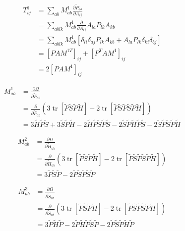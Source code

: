 \documentclass{article}
\newcommand{\tr}{\operatorname{tr}}
\begin{document}
\begin{align*}
T^1_{ij} &= \sum_{ab} M^1_{ab} \frac{\partial \tilde P_{ab}}{\partial A_{ij}} \\
         &= \sum_{ablk} M^1_{ab} \frac{\partial}{\partial A_{ij}} A_{la} P_{lk}  A_{kb} \\
         &= \sum_{ablk} M^1_{ab} \left [ \delta_{li} \delta_{aj} P_{lk}  A_{kb} + A_{la} P_{lk} \delta_{ki} \delta_{bj} \right ]\\
         &= \left [ P A M^{1T} \right ]_{ij}  +  \left [ P^T A M^1 \right ]_{ij} \\
         &= 2 \left [ P A M^{1} \right ]_{ij}
\end{align*}

\begin{align*}
    M^1_{ab} &= \frac{\partial \Omega}{\partial \tilde P_{ab}}\\
    & = \frac{\partial}{\partial \tilde P_{ab}} \left (3\tr[\tilde P \tilde S \tilde P \tilde H ] - 2\tr[\tilde P \tilde S \tilde P \tilde S \tilde P \tilde H] \right )\\
    & = 3 \tilde H \tilde P \tilde S  + 3 \tilde S \tilde  P \tilde H        -2 \tilde H\tilde P\tilde S\tilde P\tilde S   -2 \tilde S\tilde P\tilde H\tilde P\tilde S  -2\tilde  S\tilde P\tilde S\tilde P\tilde H
\end{align*}

\begin{align*}
    M^2_{ab} &= \frac{\partial \Omega}{\partial \tilde H_{ab}}\\
    & = \frac{\partial}{\partial \tilde H_{ab}} \left (3\tr[\tilde P \tilde S \tilde P \tilde H ] - 2\tr[\tilde P \tilde S \tilde P \tilde S \tilde P \tilde H] \right )\\
    & = 3 \tilde P \tilde S \tilde P - 2 \tilde P \tilde S \tilde P \tilde S \tilde P
\end{align*}

\begin{align*}
    M^3_{ab} &= \frac{\partial \Omega}{\partial \tilde S_{ab}}\\
    & = \frac{\partial}{\partial \tilde S_{ab}} \left (3\tr[\tilde P \tilde S \tilde P \tilde H ] - 2\tr[\tilde P \tilde S \tilde P \tilde S \tilde P \tilde H] \right )\\
    & =  3\tilde P \tilde H  \tilde P - 2 \tilde P \tilde H\tilde P\tilde  S\tilde  P  - 2 \tilde P\tilde S \tilde P\tilde H\tilde P
\end{align*}


\end{document}
